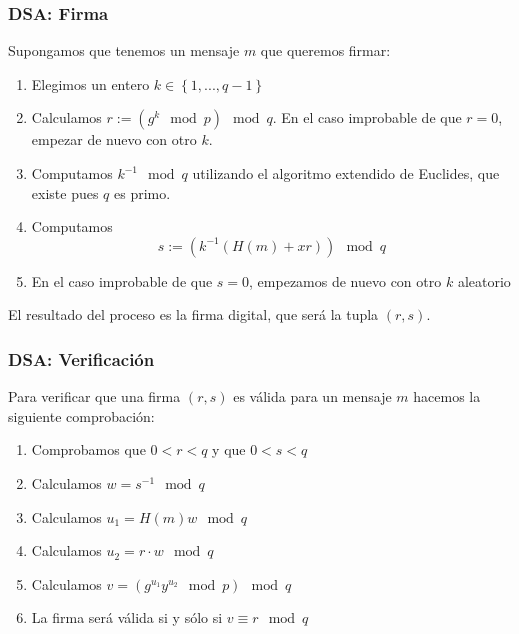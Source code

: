 \documentclass{beamer}
\begin{document}
\begin{frame}
    \frametitle{DSA: Firma}

    Supongamos que tenemos un mensaje $m$ que queremos firmar:

    \begin{enumerate}
        \item Elegimos un entero $k \in \left\{1, ..., q-1\right\}$ 
        \item Calculamos $r := \left(g^k \mod p\right) \mod q$. En el caso improbable de que $r=0$, empezar de nuevo con otro $k$.
        \item Computamos $k^{-1} \mod q$ utilizando el algoritmo extendido de Euclides, que existe pues $q$ es primo.
        \item Computamos $$s := \left( k^{-1} \left( H(m) + x r  \right) \right) \mod q$$
        \item En el caso improbable de que $s=0$, empezamos de nuevo con otro $k$ aleatorio
    \end{enumerate}

    El resultado del proceso es la firma digital, que será la tupla $(r, s)$.

\end{frame}

\begin{frame}
    \frametitle{DSA: Verificación}

    Para verificar que una firma $(r, s)$ es válida para un mensaje $m$ hacemos la siguiente comprobación:
    \begin{enumerate}
        \item Comprobamos que $0 < r < q$ y que $0 < s < q$
        \item Calculamos $w = s^{-1} \mod q$
        \item Calculamos $u_1 = H(m)w \mod q$
        \item Calculamos $u_2 = r \cdot w \mod q$
        \item Calculamos $v = \left( g^{u_1} y^{u_2} \mod p \right) \mod q$
        \item La firma será válida si y sólo si $v \equiv r \mod q$
    \end{enumerate}

\end{frame}
\end{document}
